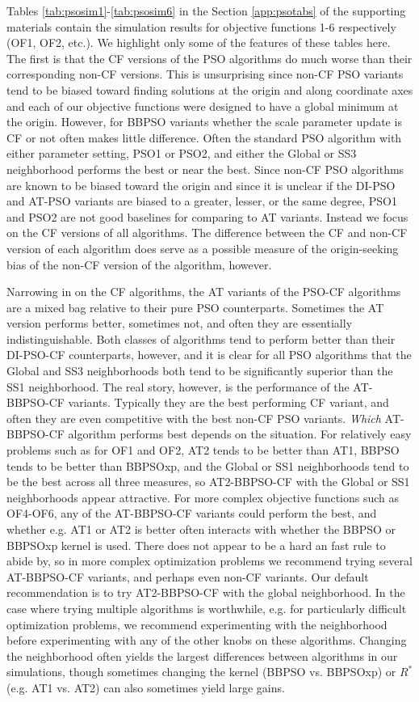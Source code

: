 \documentclass[cmbright]{staauth}
\begin{document}
Tables \ref{tab:psosim1}-\ref{tab:psosim6} in the Section \ref{app:psotabs} of the supporting materials contain the simulation results for objective functions 1-6 respectively (OF1, OF2, etc.). We highlight only some of the features of these tables here. The first is that the CF versions of the PSO algorithms do much worse than their corresponding non-CF versions. This is unsurprising since non-CF PSO variants tend to be biased toward finding solutions at the origin and along coordinate axes and each of our objective functions were designed to have a global minimum at the origin. However, for BBPSO variants whether the scale parameter update is CF or not often makes little difference. Often the standard PSO algorithm with either parameter setting, PSO1 or PSO2, and either the Global or SS3 neighborhood performs the best or near the best. Since non-CF PSO algorithms are known to be biased toward the origin and since it is unclear if the DI-PSO and AT-PSO variants are biased to a greater, lesser, or the same degree, PSO1 and PSO2 are not good baselines for comparing to AT variants. Instead we focus on the CF versions of all algorithms. The difference between the CF and non-CF version of each algorithm does serve as a possible measure of the origin-seeking bias of the non-CF version of the algorithm, however.

Narrowing in on the CF algorithms, the AT variants of the PSO-CF algorithms are a mixed bag relative to their pure PSO counterparts. Sometimes the AT version performs better, sometimes not, and often they are essentially indistinguishable. Both classes of algorithms tend to perform better than their DI-PSO-CF counterparts, however, and it is clear for all PSO algorithms that the Global and SS3 neighborhoods both tend to be significantly superior than the SS1 neighborhood. The real story, however, is the performance of the AT-BBPSO-CF variants. Typically they are the best performing CF variant, and often they are even competitive with the best non-CF PSO variants. \emph{Which} AT-BBPSO-CF algorithm performs best depends on the situation. For relatively easy problems such as for OF1 and OF2, AT2 tends to be better than AT1, BBPSO tends to be better than BBPSOxp, and the Global or SS1 neighborhoods tend to be the best across all three measures, so AT2-BBPSO-CF with the Global or SS1 neighborhoods appear attractive. For more complex objective functions such as OF4-OF6, any of the AT-BBPSO-CF variants could perform the best, and whether e.g. AT1 or AT2 is better often interacts with whether the BBPSO or BBPSOxp kernel is used. There does not appear to be a hard an fast rule to abide by, so in more complex optimization problems we recommend trying several AT-BBPSO-CF variants, and perhaps even non-CF variants. Our default recommendation is to try AT2-BBPSO-CF with the global neighborhood. In the case where trying multiple algorithms is worthwhile, e.g. for particularly difficult optimization problems, we recommend experimenting with the neighborhood before experimenting with any of the other knobs on these algorithms. Changing the neighborhood often yields the largest differences between algorithms in our simulations, though sometimes changing the kernel (BBPSO vs. BBPSOxp) or $R^*$ (e.g. AT1 vs. AT2) can also sometimes yield large gains.
\end{document}
